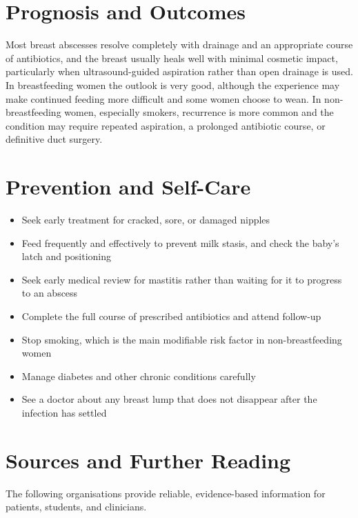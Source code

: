 \section*{Prognosis and Outcomes}
Most breast abscesses resolve completely with drainage and an appropriate course of antibiotics, and the breast usually heals well with minimal cosmetic impact, particularly when ultrasound-guided aspiration rather than open drainage is used. In breastfeeding women the outlook is very good, although the experience may make continued feeding more difficult and some women choose to wean. In non-breastfeeding women, especially smokers, recurrence is more common and the condition may require repeated aspiration, a prolonged antibiotic course, or definitive duct surgery.

\section*{Prevention and Self-Care}
\begin{itemize}
    \item Seek early treatment for cracked, sore, or damaged nipples
    \item Feed frequently and effectively to prevent milk stasis, and check the baby's latch and positioning
    \item Seek early medical review for mastitis rather than waiting for it to progress to an abscess
    \item Complete the full course of prescribed antibiotics and attend follow-up
    \item Stop smoking, which is the main modifiable risk factor in non-breastfeeding women
    \item Manage diabetes and other chronic conditions carefully
    \item See a doctor about any breast lump that does not disappear after the infection has settled
\end{itemize}

\section*{Sources and Further Reading}
The following organisations provide reliable, evidence-based information for patients, students, and clinicians.


